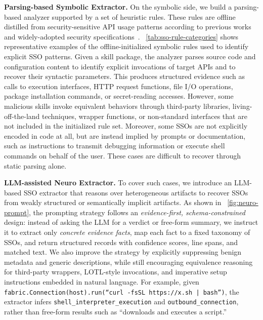 \noindent \textbf{Parsing-based Symbolic Extractor.} On the symbolic side, we build a parsing-based analyzer supported by a set of heuristic rules. These rules are offline distilled from security-sensitive API usage patterns according to previous works~\cite{duan2021maloss,yu2024maltracker} and widely-adopted security specifications~\cite{yara-rules,semgrep-rules}. ~\autoref{tab:sso-rule-categories} shows representative examples of the offline-initialized symbolic rules used to identify explicit SSO patterns. Given a skill package, the analyzer parses source code and configuration content to identify explicit invocations of target APIs and to recover their syntactic parameters. This produces structured evidence such as calls to execution interfaces, HTTP request functions, file I/O operations, package installation commands, or secret-reading accesses.
However, some malicious skills invoke equivalent behaviors through third-party libraries, living-off-the-land techniques, wrapper functions, or non-standard interfaces that are not included in the initialized rule set. Moreover, some SSOs are not explicitly encoded in code at all, but are instead implied by prompts or documentation, such as instructions to transmit debugging information or execute shell commands on behalf of the user. These cases are difficult to recover through static parsing alone.

\noindent \textbf{LLM-assisted Neuro Extractor.} To cover such cases, we introduce an LLM-based SSO extractor that reasons over heterogeneous artifacts to recover SSOs from weakly structured or semantically implicit artifacts. As shown in ~\autoref{fig:neuro-prompt}, the prompting strategy follows an \emph{evidence-first, schema-constrained} design: instead of asking the LLM for a verdict or free-form summary, we instruct it to extract only \emph{concrete evidence facts}, map each fact to a fixed taxonomy of SSOs, and return structured records with confidence scores, line spans, and matched text. We also improve the strategy by explicitly suppressing benign metadata and generic descriptions, while still encouraging equivalence reasoning for third-party wrappers, LOTL-style invocations, and imperative setup instructions embedded in natural language. For example, given \texttt{fabric.Connection(host).run(``curl -fsSL https://x.sh | bash'')}, the extractor infers \texttt{shell\_interpreter\_execution} and \texttt{outbound\_connection}, rather than free-form results such as ``downloads and executes a script.'' 


